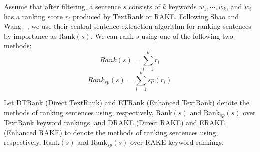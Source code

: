 \documentclass[a4paper,twoside]{article}
\begin{document}
Assume that after filtering, a sentence $s$ consists of $k$ keywords $w_1, \cdots, w_k$, and $w_i$ has a ranking score $r_i$
produced by TextRank or RAKE. 
Following Shao and Wang ~\cite{Shao:16}, we use their central sentence extraction algorithm for ranking sentences by importance as $\mbox{Rank}(s)$.
We can rank $s$ using one of the following two methods:
\begin{equation}\label{eq2}
{Rank}(s) = \sum_{i=1}^{k} r_i
\end{equation}
\begin{equation}\label{eq3}
{Rank}_{sp}(s) = \sum_{i=1}^{k} sp(r_i)
\end{equation}
\begin{comment}
\[
\mbox{Rank}(s) = \sum_{i=1}^{k} r_i;~~
\mbox{Rank}_{sp}(s) = \sum_{i=1}^{k} sp(r_i).
\]
\end{comment}
Let DTRank (Direct TextRank) and ETRank (Enhanced TextRank) denote
the methods of ranking sentences using, respectively,
$\mbox{Rank}(s)$ and $\mbox{Rank}_{sp}(s)$ over TextRank keyword rankings,
and
%
DRAKE (Direct RAKE) and ERAKE (Enhanced RAKE)
to denote the methods of ranking sentences
using, respectively, $\mbox{Rank}(s)$ and $\mbox{Rank}_{sp}(s)$ over RAKE keyword rankings.

%
%
\end{document}
